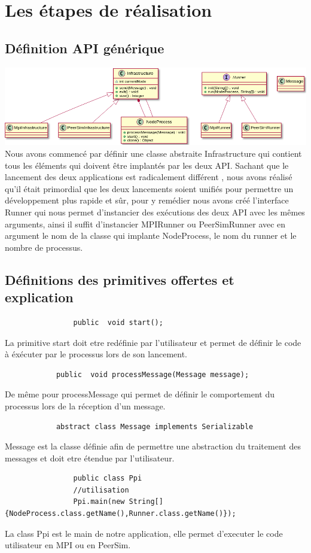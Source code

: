 \documentclass{article}
\begin{document}
		\section{Les étapes de réalisation}
			\subsection{Définition API générique}
			\hspace*{-2cm} \includegraphics[width=19cm]{Ppi_uml.png}
			Nous avons commencé par définir une classe abstraite Infrastructure  qui contient tous les éléments qui doivent être implantés par les deux API.
			\newline
			Sachant que le lancement des deux applications est radicalement différent , nous avons réalisé qu'il était primordial que les deux 
			lancements soient unifiés pour permettre un développement plus rapide et sûr, pour y remédier nous avons créé l'interface Runner qui nous permet 
			d'instancier des exécutions des deux API avec les mêmes arguments, ainsi il suffit d'instancier MPIRunner ou PeerSimRunner avec en argument
			le nom de la classe qui implante NodeProcess, le nom du runner et le nombre de processus.
			\subsection{Définitions des primitives offertes et explication}
			\begin{lstlisting}
				public  void start();
			\end{lstlisting}
			La primitive start  doit etre redéfinie par l'utilisateur et permet de définir le code à éxécuter par le processus lors de son lancement.
			\begin{lstlisting}
			public  void processMessage(Message message);
			\end{lstlisting}
			De même pour processMessage qui permet  de définir le comportement du processus lors de la réception d'un message.
			\begin{lstlisting}
			abstract class Message implements Serializable
			\end{lstlisting}
			Message est la classe définie afin de permettre une abstraction du traitement des messages et doit etre étendue par l'utilisateur.
			\newpage
			\begin{lstlisting}
				public class Ppi
				//utilisation
				Ppi.main(new String[] {NodeProcess.class.getName(),Runner.class.getName()});
			\end{lstlisting}
			La class Ppi est le main de notre application, elle permet d'executer le code utilisateur en MPI ou en PeerSim.
\end{document}
